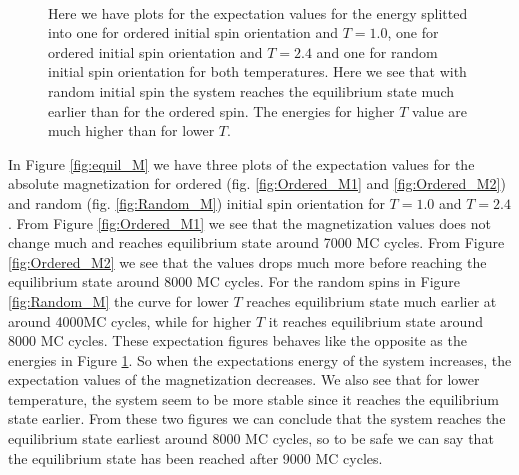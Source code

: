 \documentclass[12pt,a4paper,english]{article}
\begin{document}
\begin{figure}[htbp]
	\hspace{0.5em}
	\\
	\caption{Here we have plots for the expectation values for the energy splitted into one for ordered initial spin orientation and $T=1.0$, one for ordered initial spin orientation and $T=2.4$ and one for random initial spin orientation for both temperatures. Here we see that with random initial spin the system reaches the equilibrium state much earlier than for the ordered spin. The energies for higher $T$ value are much higher than for lower $T$.\label{fig:equil_E}}
\end{figure}

In Figure \ref{fig:equil_M} we have three plots of the expectation values for the absolute magnetization for ordered (fig. \ref{fig:Ordered_M1} and \ref{fig:Ordered_M2}) and random (fig. \ref{fig:Random_M}) initial spin orientation for $T=1.0$ and $T=2.4$. From Figure \ref{fig:Ordered_M1} we see that the magnetization values does not change much and reaches equilibrium state around 7000 MC cycles. From Figure \ref{fig:Ordered_M2} we see that the values drops much more before reaching the equilibrium state around 8000 MC cycles. For the random spins in Figure \ref{fig:Random_M} the curve for lower $T$ reaches equilibrium state much earlier at around 4000MC cycles, while for higher $T$ it reaches equilibrium state around 8000 MC cycles. These expectation figures behaves like the opposite as the energies in Figure \ref{fig:equil_E}. So when the expectations energy of the system increases, the expectation values of the magnetization decreases. We also see that for lower temperature, the system seem to be more stable since it reaches the equilibrium state earlier. From these two figures we can conclude that the system reaches the equilibrium state earliest around 8000 MC cycles, so to be safe we can say that the equilibrium state has been reached after 9000 MC cycles.
\end{document}
